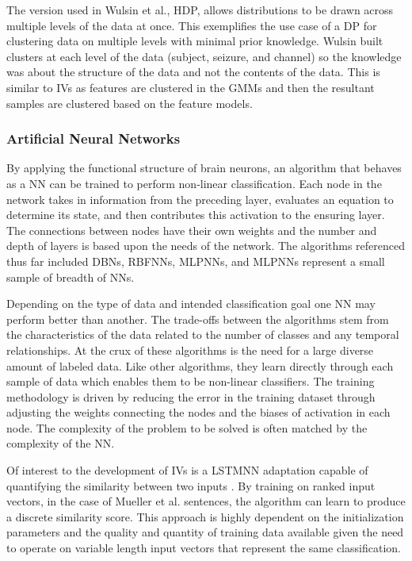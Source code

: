 The version used in Wulsin et al.\cite{Wulsin2012}, \ac{HDP}, allows distributions to be drawn across multiple levels of the data at once. This exemplifies the use case of a \ac{DP} for clustering data on multiple levels with minimal prior knowledge. Wulsin built clusters at each level of the data (subject, seizure, and channel) so the knowledge was about the structure of the data and not the contents of the data. This is similar to \acp{IV} as features are clustered in the \acp{GMM} and then the resultant samples are clustered based on the feature models.

\subsubsection{Artificial Neural Networks}

By applying the functional structure of brain neurons, an algorithm that behaves as a \ac{NN} can be trained to perform non-linear classification. Each node in the network takes in information from the preceding layer, evaluates an equation to determine its state, and then contributes this activation to the ensuring layer. The connections between nodes have their own weights and the number and depth of layers is based upon the needs of the network. The algorithms referenced thus far included \acp{DBN}, \acp{RBFNN}, \acp{MLPNN}, and \acp{MLPNN} represent a small sample of breadth of \acp{NN}.

Depending on the type of data and intended classification goal one \ac{NN} may perform better than another. The trade-offs between the algorithms stem from the characteristics of the data related to the number of classes and any temporal relationships. At the crux of these algorithms is the need for a large diverse amount of labeled data. Like other algorithms, they learn directly through each sample of data which enables them to be non-linear classifiers. The training methodology is driven by reducing the error in the training dataset through adjusting the weights connecting the nodes and the biases of activation in each node. The complexity of the problem to be solved is often matched by the complexity of the \ac{NN}.

Of interest to the development of \acp{IV} is a \ac{LSTMNN} adaptation capable of quantifying the similarity between two inputs \cite{Mueller2016}. By training on ranked input vectors, in the case of Mueller et al. \cite{Mueller2016} sentences, the algorithm can learn to produce a discrete similarity score. This approach is highly dependent on the initialization parameters and the quality and quantity of training data available given the need to operate on variable length input vectors that represent the same classification.

